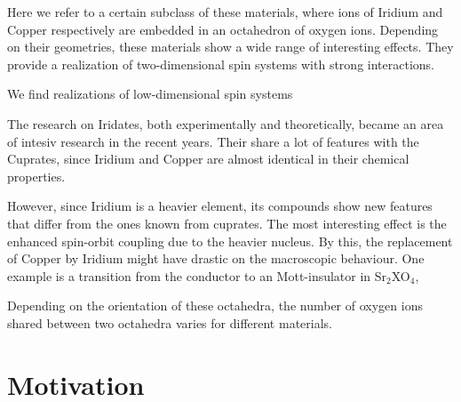 Here we refer to a certain subclass of these materials, where ions of Iridium and Copper respectively are embedded in an octahedron of oxygen ions.
Depending on their geometries, these materials show a wide range of interesting effects.
They provide a realization of two-dimensional spin systems with strong interactions. 




We find realizations of low-dimensional spin systems

The research on Iridates, both experimentally and theoretically, became an area of intesiv research in the recent years. 
Their share a lot of features with the Cuprates, since Iridium and Copper are almost identical in their chemical properties. 

However, since Iridium is a heavier element, its compounds show new features that differ from the ones known from cuprates.
The most interesting effect is the enhanced spin-orbit coupling due to the heavier nucleus.
By this, the replacement of Copper by Iridium might have drastic on the macroscopic behaviour. 
One example is a transition from the conductor to an Mott-insulator in Sr$_2$XO$_4$, 

Depending on the orientation of these octahedra, the number of oxygen ions shared between two octahedra varies for different materials. 





\section{Motivation}



